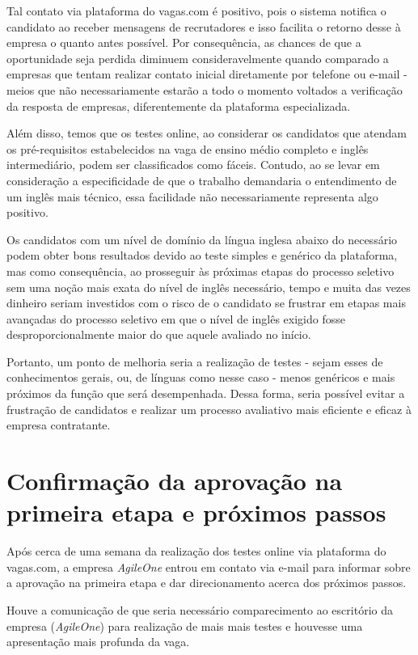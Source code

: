 \documentclass[12pt]{article}
\begin{document}
Tal contato via plataforma do vagas.com é positivo, pois o sistema notifica o candidato ao receber mensagens de recrutadores e isso facilita o retorno desse à empresa o quanto antes possível. Por consequência, as chances de que a oportunidade seja perdida diminuem consideravelmente quando comparado a empresas que tentam realizar contato inicial diretamente por telefone ou e-mail - meios que não necessariamente estarão a todo o momento voltados a verificação da resposta de empresas, diferentemente da plataforma especializada.

Além disso, temos que os testes online, ao considerar os candidatos que atendam os pré-requisitos estabelecidos na vaga de ensino médio completo e inglês intermediário, podem ser classificados como fáceis. Contudo, ao se levar em consideração a especificidade de que o trabalho demandaria o entendimento de um inglês mais técnico, essa facilidade não necessariamente representa algo positivo. 

Os candidatos com um nível de domínio da língua inglesa abaixo do necessário podem obter bons resultados devido ao teste simples e genérico da plataforma, mas como consequência, ao prosseguir às próximas etapas do processo seletivo sem uma noção mais exata do nível de inglês necessário, tempo e muita das vezes dinheiro seriam investidos com o risco de o candidato se frustrar em etapas mais avançadas do processo seletivo em que o nível de inglês exigido fosse desproporcionalmente maior do que aquele avaliado no início. 

Portanto, um ponto de melhoria seria a realização de testes - sejam esses de conhecimentos gerais, ou, de línguas como nesse caso - menos genéricos e mais próximos da função que será desempenhada. Dessa forma, seria possível evitar a frustração de candidatos e realizar um processo avaliativo mais eficiente e eficaz à empresa contratante.



\section{Confirmação da aprovação na primeira etapa e próximos passos}

Após cerca de uma semana da realização dos testes online via plataforma do vagas.com, a empresa \emph {AgileOne} entrou em contato via e-mail para informar sobre a aprovação na primeira etapa e dar direcionamento acerca dos próximos passos. 

Houve a comunicação de que seria necessário comparecimento ao escritório da empresa (\emph {AgileOne}) para realização de mais mais testes e houvesse uma apresentação mais profunda da vaga.
\end{document}
